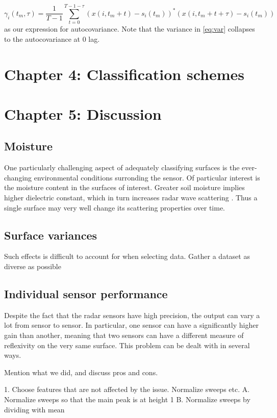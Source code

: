 \documentclass[a4paper, 12pt]{article}
\begin{document}
\begin{equation}
	\gamma_i(t_m, \tau) = \frac{1}{T-1}\sum_{t=0}^{T-1- \tau}(x(i, t_m + t) - s_i(t_m))^*(x(i, t_m + t + \tau) - s_i(t_m))
\end{equation}
as our expression for autocovariance. Note that the variance in \ref{eq:var} collapses to the autocovariance at 0 lag. 


\section{Chapter 4: Classification schemes}

\section{Chapter 5: Discussion}


\subsection{Moisture}

One particularly challenging aspect of adequately classifying surfaces is the ever-changing environmental conditions surronding the sensor. Of particular interest is the moisture content in the surfaces of interest. Greater soil moisture implies higher dielectric constant, which in turn increases radar wave scattering \citep{rappaport_2006}. Thus a single surface may very well change its scattering properties over time. 


\subsection{Surface variances}

Such effects is difficult to account for when selecting data. Gather a dataset as diverse as possible

\subsection{Individual sensor performance}
Despite the fact that the radar sensors have high precision, the output can vary a lot from sensor to sensor. In particular, one sensor can have a significantly higher gain than another, meaning that two sensors can have a different measure of reflexivity on the very same surface. This problem can be dealt with in several ways. 

Mention what we did, and discuss pros and cons.

1. Choose features that are not affected by the issue. Normalize sweeps etc.
	A. Normalize sweeps so that the main peak is at height 1
	B. Normalize sweeps by dividing with mean 

\newpage


\end{document}
